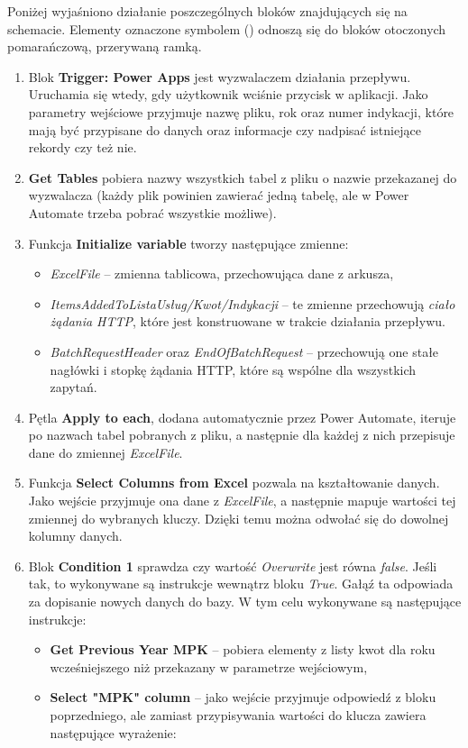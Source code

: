 \pagebreak
Poniżej wyjaśniono działanie poszczególnych bloków znajdujących się na schemacie. Elementy oznaczone symbolem (\textasteriskcentered) odnoszą się do bloków otoczonych pomarańczową, przerywaną ramką.
\begin{enumerate}
    \item Blok \textbf{Trigger: Power Apps} jest wyzwalaczem działania przepływu. Uruchamia się wtedy, gdy użytkownik wciśnie przycisk w aplikacji. Jako parametry wejściowe przyjmuje nazwę pliku, rok oraz numer indykacji, które mają być przypisane do danych oraz informacje czy nadpisać istniejące rekordy czy też nie.

    \item \textbf{Get Tables} pobiera nazwy wszystkich tabel z pliku o nazwie przekazanej do wyzwalacza (każdy plik powinien zawierać jedną tabelę, ale w Power Automate trzeba pobrać wszystkie możliwe).
    \item Funkcja \textbf{Initialize variable} tworzy następujące zmienne:
          \begin{itemize}
              \item \emph{ExcelFile} -- zmienna tablicowa, przechowująca dane z arkusza,
              \item \emph{ItemsAddedToListaUsług/Kwot/Indykacji} -- te zmienne przechowują \emph{ciało żądania HTTP}, które jest konstruowane w trakcie działania przepływu.
              \item \emph{BatchRequestHeader} oraz \emph{EndOfBatchRequest} -- przechowują one stałe nagłówki i stopkę żądania HTTP, które są wspólne dla wszystkich zapytań.
          \end{itemize}
    \item Pętla \textbf{Apply to each}, dodana automatycznie przez Power Automate, iteruje po nazwach tabel pobranych z pliku, a następnie dla każdej z nich przepisuje dane do zmiennej \emph{ExcelFile}.
    \item Funkcja \textbf{Select Columns from Excel} pozwala na kształtowanie danych. Jako wejście przyjmuje ona dane z \emph{ExcelFile}, a następnie mapuje wartości tej zmiennej do wybranych kluczy. Dzięki temu można odwołać się do dowolnej kolumny danych.
    \item Blok \textbf{Condition 1} sprawdza czy wartość \emph{Overwrite} jest równa \emph{false}.
          Jeśli tak, to wykonywane są instrukcje wewnątrz bloku \emph{True}. Gałąź ta odpowiada za dopisanie nowych danych do bazy. W tym celu wykonywane są następujące instrukcje:
          \begin{itemize}[label=\textasteriskcentered]
              \item \textbf{Get Previous Year MPK} -- pobiera elementy z listy kwot dla roku wcześniejszego niż przekazany w parametrze wejściowym,
              \item \textbf{Select "MPK" column} -- jako wejście przyjmuje odpowiedź z bloku poprzedniego, ale zamiast przypisywania wartości do klucza zawiera następujące wyrażenie:


\end{itemize}
\end{enumerate}
